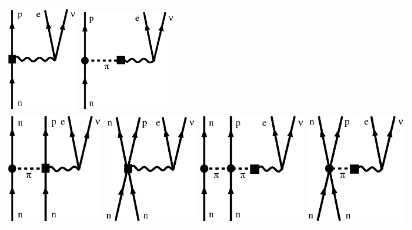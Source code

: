 \begin{figure}[t]
	\begin{center}
		\includegraphics[width=0.16\textwidth]{img/1bc.eps} \hspace{1cm}
			\includegraphics[width=0.22\textwidth]{img/1bc_pion.eps} \\ \vspace{0.5cm}
			\includegraphics[width=0.22\textwidth]{img/2bc_long.eps} \hspace{.2cm}
			\includegraphics[width=0.21\textwidth]{img/2bc_short.eps} \hspace{.2cm}
   \includegraphics[width=0.245\textwidth]{img/2bc_long_pion.eps}
   \hspace{.2cm} 
   \includegraphics[width=0.225\textwidth]{img/2bc_short_pion.eps}

\end{center}
\end{figure}
